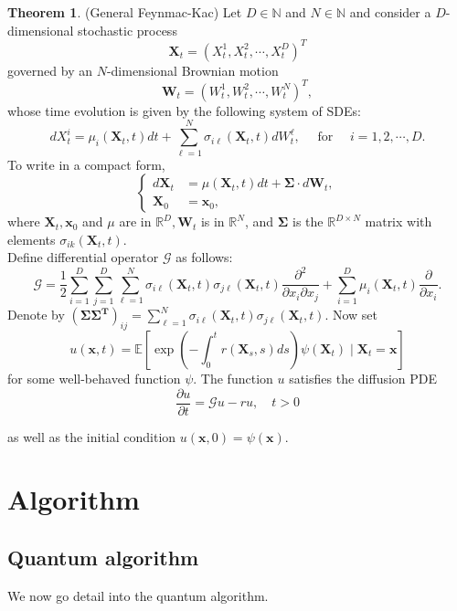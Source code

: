\documentclass[11pt]{article}
\theoremstyle{definition}
\newtheorem{theorem}{Theorem}[section]
\begin{document}
\begin{theorem}(General Feynmac-Kac)
Let $D \in \mathbb{N}$ and $N \in \mathbb{N}$ and consider a $D$-dimensional stochastic process
$$
\mathbf{X}_t=\left(X_t^1, X_t^2, \cdots, X_t^D\right)^T
$$
governed by an $N$-dimensional Brownian motion
$$
\mathbf{W}_t=\left(W_t^1, W_t^2, \cdots, W_t^N\right)^T,
$$
whose time evolution is given by the following system of SDEs:
$$
d X_t^i=\mu_i\left(\mathbf{X}_t, t\right) d t+\sum_{\ell=1}^N \sigma_{i \ell}\left(\mathbf{X}_t, t\right) d W_t^{\ell}, \quad \text { for } \quad i=1,2, \cdots, D .
$$
To write in a compact form,
$$
\begin{cases}d \mathbf{X}_t & =\mu\left(\mathbf{X}_t, t\right) d t+\boldsymbol{\Sigma} \cdot d \mathbf{W}_t, \\ \mathbf{X}_0 & =\mathbf{x}_0,\end{cases}
$$
where $\mathbf{X}_t, \mathbf{x}_0$ and $\mu$ are in $\mathbb{R}^D, \mathbf{W}_t$ is in $\mathbb{R}^N$, and $\boldsymbol{\Sigma}$ is the $\mathbb{R}^{D \times N}$ matrix with elements $\sigma_{i k}\left(\mathbf{X}_t, t\right)$. \\
Define differential operator $\mathcal{G}$ as follows:
$$
\mathcal{G}=\frac{1}{2} \sum_{i=1}^D \sum_{j=1}^D \sum_{\ell=1}^N \sigma_{i \ell}\left(\mathbf{X}_t, t\right) \sigma_{j \ell}\left(\mathbf{X}_t, t\right) \frac{\partial^2}{\partial x_i \partial x_j}+\sum_{i=1}^D \mu_i\left(\mathbf{X}_t, t\right) \frac{\partial}{\partial x_i} .
$$
Denote by $\left(\boldsymbol{\Sigma} \boldsymbol{\Sigma}^{\mathbf{T}}\right)_{i j}=\sum_{\ell=1}^N \sigma_{i \ell}\left(\mathbf{X}_t, t\right) \sigma_{j \ell}\left(\mathbf{X}_t, t\right)$.  Now set
$$
u(\mathbf{x}, t)=\mathbb{E}\left[\exp \left(-\int_0^t r\left(\mathbf{X}_s, s\right) d s\right) \psi\left(\mathbf{X}_t\right) \mid \mathbf{X}_t=\mathbf{x}\right]
$$
for some well-behaved function $\psi$. The function $u$  satisfies the diffusion PDE
$$
\frac{\partial u}{\partial t}=\mathcal{G} u-r u, \quad t>0
$$

as well as the initial condition $u(\mathbf{x}, 0)=\psi(\mathbf{x})$. 
\end{theorem}

\section{Algorithm}
\subsection{Quantum algorithm}
We now go detail into the quantum algorithm.
\end{document}
